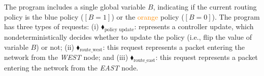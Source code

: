 %
The program includes a single global variable $B$, indicating if the current routing policy is the  \textcolor{NavyBlue}{blue} policy ($[B=1]$) or the \textcolor{darkorange}{orange} policy ($[B=0]$).
%
The program has three types of requests:
%	
	(i)
	{\color{ForestGreen}$\blacklozenge_\text{policy update}$}:
 represents a controller  update, which nondeterministically decides whether to update the policy (i.e., flip the value of  variable $B$) or not;
%	
(ii)
	{\color{ForestGreen}$\blacklozenge_\text{route\_west}$}:
	 this request represents a packet entering the network from the \textit{WEST} node; and 
%	
(iii)
{\color{ForestGreen}$\blacklozenge_\text{route\_east}$}: this request represents a packet entering the network from the \textit{EAST} node.
%


